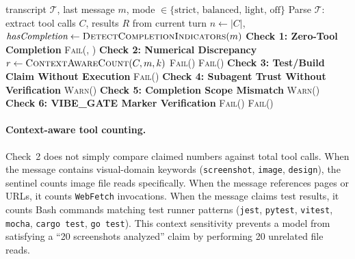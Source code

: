 \begin{algorithm}[t]
\caption{Completion Sentinel: Six Mechanical Checks}
\label{alg:sentinel}
\begin{algorithmic}[1]
\Require transcript $\mathcal{T}$, last message $m$, mode $\in \{\text{strict, balanced, light, off}\}$
\State Parse $\mathcal{T}$: extract tool calls $C$, results $R$ from current turn
\State $n \gets |C|$, $\textit{hasCompletion} \gets \textsc{DetectCompletionIndicators}(m)$
\Statex
\State \textbf{Check 1: Zero-Tool Completion}
    \State \Return \textsc{Fail}(, )
\EndIf
\Statex
\State \textbf{Check 2: Numerical Discrepancy}
    \State $r \gets \textsc{ContextAwareCount}(C, m, k)$ 
     \Return \textsc{Fail}() \EndIf
     \Return \textsc{Fail}() \EndIf
\EndFor
\Statex
\State \textbf{Check 3: Test/Build Claim Without Execution}
    \State \Return \textsc{Fail}()
\EndIf
\Statex
\State \textbf{Check 4: Subagent Trust Without Verification}
    \State \Return \textsc{Warn}()
\EndIf
\Statex
\State \textbf{Check 5: Completion Scope Mismatch}
    \State \Return \textsc{Warn}()
\EndIf
\Statex
\State \textbf{Check 6: VIBE\_GATE Marker Verification}
    \State \Return \textsc{Fail}()
\EndIf
{}
    \State \Return \textsc{Fail}()
\EndIf
\end{algorithmic}
\end{algorithm}

\paragraph{Context-aware tool counting.}
Check~2 does not simply compare claimed numbers against total tool calls.
When the message contains visual-domain keywords (\texttt{screenshot}, \texttt{image}, \texttt{design}), the sentinel counts image file reads specifically.
When the message references pages or URLs, it counts \texttt{WebFetch} invocations.
When the message claims test results, it counts Bash commands matching test runner patterns (\texttt{jest}, \texttt{pytest}, \texttt{vitest}, \texttt{mocha}, \texttt{cargo test}, \texttt{go test}).
This context sensitivity prevents a model from satisfying a ``20 screenshots analyzed'' claim by performing 20 unrelated file reads.

